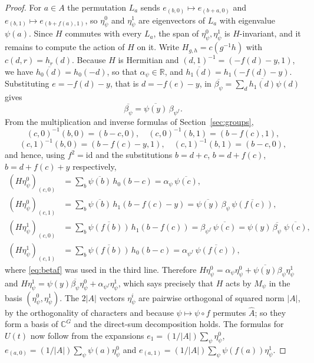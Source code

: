 \documentclass[preprint,11pt]{elsarticle}
\theoremstyle{definition}
\theoremstyle{remark}
\begin{document}
\begin{proof}
For $a\in A$ the permutation $L_a$ sends $e_{(b,0)}\mapsto e_{(b+a,0)}$ and $e_{(b,1)}\mapsto e_{(b+f(a),1)}$, so $\eta^0_\psi$ and $\eta^1_\psi$ are eigenvectors of $L_a$ with eigenvalue $\psi(a)$. Since $H$ commutes with every $L_a$, the span of $\eta^0_\psi,\eta^1_\psi$ is $H$-invariant, and it remains to compute the action of $H$ on it. Write $H_{g,h}=c(g^{-1}h)$ with $c(d,r)=h_r(d)$. Because $H$ is Hermitian and $(d,1)^{-1}=(-f(d)-y,1)$, we have $\overline{h_0(d)}=h_0(-d)$, so that $\alpha_\psi\in\mathbb R$, and $\overline{h_1(d)}=h_1(-f(d)-y)$. Substituting $e=-f(d)-y$, that is $d=-f(e)-y$, in $\overline{\beta_\psi}=\sum_d\overline{h_1(d)}\psi(d)$ gives
\begin{equation}\label{eq:betaf}
\overline{\beta_\psi}=\overline{\psi(y)}\,\beta_{\psi^f}.
\end{equation}
From the multiplication and inverse formulas of Section~\ref{sec:groups},
\[
(c,0)^{-1}(b,0)=(b-c,0),\quad (c,0)^{-1}(b,1)=(b-f(c),1),
\]
\[
(c,1)^{-1}(b,0)=(b-f(c)-y,1),\quad (c,1)^{-1}(b,1)=(b-c,0),
\]
and hence, using $f^2=\mathrm{id}$ and the substitutions $b=d+c$, $b=d+f(c)$, $b=d+f(c)+y$ respectively,
\begin{align*}
(H\eta^0_\psi)_{(c,0)}&=\sum_b\overline{\psi(b)}\,h_0(b-c)=\alpha_\psi\,\overline{\psi(c)},\\
(H\eta^0_\psi)_{(c,1)}&=\sum_b\overline{\psi(b)}\,h_1(b-f(c)-y)=\overline{\psi(y)}\,\beta_\psi\,\overline{\psi(f(c))},\\
(H\eta^1_\psi)_{(c,0)}&=\sum_b\overline{\psi(f(b))}\,h_1(b-f(c))=\beta_{\psi^f}\,\overline{\psi(c)}=\psi(y)\,\overline{\beta_\psi}\;\overline{\psi(c)},\\
(H\eta^1_\psi)_{(c,1)}&=\sum_b\overline{\psi(f(b))}\,h_0(b-c)=\alpha_{\psi^f}\,\overline{\psi(f(c))},
\end{align*}
where \eqref{eq:betaf} was used in the third line. Therefore
$H\eta^0_\psi=\alpha_\psi\eta^0_\psi+\overline{\psi(y)}\beta_\psi\eta^1_\psi$ and
$H\eta^1_\psi=\psi(y)\overline{\beta_\psi}\eta^0_\psi+\alpha_{\psi^f}\eta^1_\psi$, which says precisely that $H$ acts by $M_\psi$ in the basis $(\eta^0_\psi,\eta^1_\psi)$. The $2|A|$ vectors $\eta^i_\psi$ are pairwise orthogonal of squared norm $|A|$, by the orthogonality of characters and because $\psi\mapsto\psi\circ f$ permutes $\widehat A$; so they form a basis of $\mathbb C^G$ and the direct-sum decomposition holds. The formulas for $U(t)$ now follow from the expansions $e_1=(1/|A|)\sum_\psi\eta^0_\psi$, $e_{(a,0)}=(1/|A|)\sum_\psi\psi(a)\eta^0_\psi$ and $e_{(a,1)}=(1/|A|)\sum_\psi\psi(f(a))\eta^1_\psi$.


\end{proof}
\end{document}
